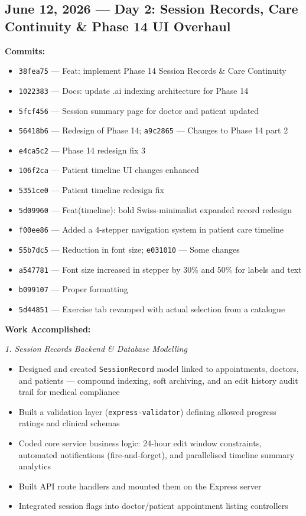 \documentclass[11pt,a4paper]{article}
\begin{document}
\subsection{June 12, 2026 — Day 2: Session Records, Care Continuity \& Phase 14 UI Overhaul}

\textbf{Commits:}
\begin{itemize}
  \item \texttt{38fea75} — Feat: implement Phase 14 Session Records \& Care Continuity
  \item \texttt{1022383} — Docs: update .ai indexing architecture for Phase 14
  \item \texttt{5fcf456} — Session summary page for doctor and patient updated
  \item \texttt{56418b6} — Redesign of Phase 14; \texttt{a9c2865} — Changes to Phase 14 part 2
  \item \texttt{e4ca5c2} — Phase 14 redesign fix 3
  \item \texttt{106f2ca} — Patient timeline UI changes enhanced
  \item \texttt{5351ce0} — Patient timeline redesign fix
  \item \texttt{5d09960} — Feat(timeline): bold Swiss-minimalist expanded record redesign
  \item \texttt{f00ee86} — Added a 4-stepper navigation system in patient care timeline
  \item \texttt{55b7dc5} — Reduction in font size; \texttt{e031010} — Some changes
  \item \texttt{a547781} — Font size increased in stepper by 30\% and 50\% for labels and text
  \item \texttt{b099107} — Proper formatting
  \item \texttt{5d44851} — Exercise tab revamped with actual selection from a catalogue
\end{itemize}

\textbf{Work Accomplished:}

\textit{1. Session Records Backend \& Database Modelling}
\begin{itemize}
  \item Designed and created \texttt{SessionRecord} model linked to appointments, doctors, and
        patients — compound indexing, soft archiving, and an edit history audit trail for
        medical compliance
  \item Built a validation layer (\texttt{express-validator}) defining allowed progress ratings
        and clinical schemas
  \item Coded core service business logic: 24-hour edit window constraints, automated
        notifications (fire-and-forget), and parallelised timeline summary analytics
  \item Built API route handlers and mounted them on the Express server
  \item Integrated session flags into doctor/patient appointment listing controllers
\end{itemize}
\end{document}
